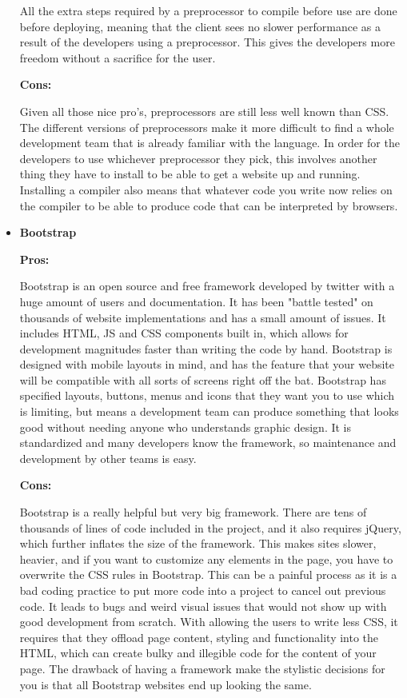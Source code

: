 \documentclass[draftclsnofoot,onecolumn,letterpaper,10pt]{IEEEtran}
\begin{document}
\begin{itemize}
				All the extra steps required by a preprocessor to compile before use are done before deploying, meaning that the client sees no slower performance as a result of the developers using a preprocessor.
				This gives the developers more freedom without a sacrifice for the user.

				\noindent \textbf{Cons:}

				Given all those nice pro's, preprocessors are still less well known than CSS.
				The different versions of preprocessors make it more difficult to find a whole development team that is already familiar with the language.
				In order for the developers to use whichever preprocessor they pick, this involves another thing they have to install to be able to get a website up and running.
				Installing a compiler also means that whatever code you write now relies on the compiler to be able to produce code that can be interpreted by browsers.


			\item{\textbf{Bootstrap}}

				\noindent \textbf{Pros:}

				Bootstrap is an open source and free framework developed by twitter with a huge amount of users and documentation.\cite{bootstrap}
				It has been "battle tested" on thousands of website implementations and has a small amount of issues.
				It includes HTML, JS and CSS components built in, which allows for development magnitudes faster than writing the code by hand.
				Bootstrap is designed with mobile layouts in mind, and has the feature that your website will be compatible with all sorts of screens right off the bat.
				Bootstrap has specified layouts, buttons, menus and icons that they want you to use which is limiting, but means a development team can produce something that looks good without needing anyone who understands graphic design.
				It is standardized and many developers know the framework, so maintenance and development by other teams is easy.

				\noindent \textbf{Cons:}

				Bootstrap is a really helpful but very big framework.
				There are tens of thousands of lines of code included in the project, and it also requires jQuery, which further inflates the size of the framework.
				This makes sites slower, heavier, and if you want to customize any elements in the page, you have to overwrite the CSS rules in Bootstrap.\cite{BootstrapProCon}
				This can be a painful process as it is a bad coding practice to put more code into a project to cancel out previous code.
				It leads to bugs and weird visual issues that would not show up with good development from scratch.
				With allowing the users to write less CSS, it requires that they offload page content, styling and functionality into the HTML, which can create bulky and illegible code for the content of your page.
				The drawback of having a framework make the stylistic decisions for you is that all Bootstrap websites end up looking the same.

		\end{itemize}
\end{document}
